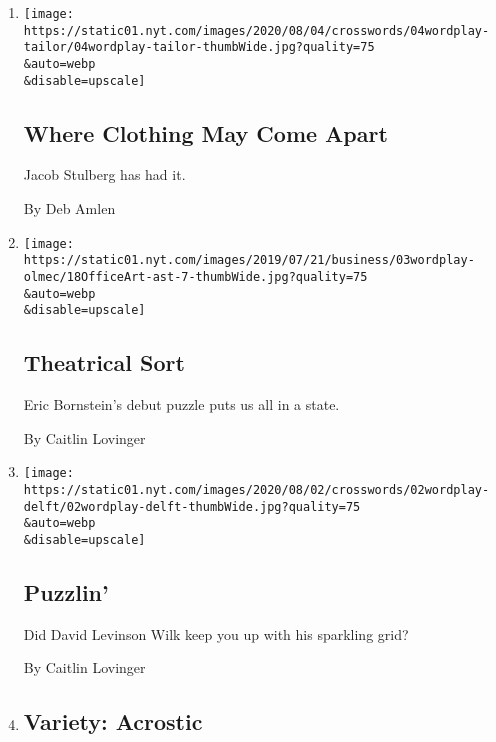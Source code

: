 \begin{enumerate}
\def\labelenumi{\arabic{enumi}.}
\item
  \href{/2020/08/03/crosswords/daily-puzzle-2020-08-04.html}{}

  \texttt{[image: https://static01.nyt.com/images/2020/08/04/crosswords/04wordplay-tailor/04wordplay-tailor-thumbWide.jpg?quality=75\\\&auto=webp\\\&disable=upscale]}

  \hypertarget{where-clothing-may-come-apart}{%
  \subsection{Where Clothing May Come
  Apart}\label{where-clothing-may-come-apart}}

  Jacob Stulberg has had it.

  By Deb Amlen
\item
  \href{/2020/08/02/crosswords/daily-puzzle-2020-08-03.html}{}

  \texttt{[image: https://static01.nyt.com/images/2019/07/21/business/03wordplay-olmec/18OfficeArt-ast-7-thumbWide.jpg?quality=75\\\&auto=webp\\\&disable=upscale]}

  \hypertarget{theatrical-sort}{%
  \subsection{Theatrical Sort}\label{theatrical-sort}}

  Eric Bornstein's debut puzzle puts us all in a state.

  By Caitlin Lovinger
\item
  \href{/2020/08/01/crosswords/daily-puzzle-2020-08-02.html}{}

  \texttt{[image: https://static01.nyt.com/images/2020/08/02/crosswords/02wordplay-delft/02wordplay-delft-thumbWide.jpg?quality=75\\\&auto=webp\\\&disable=upscale]}

  \hypertarget{puzzlin}{%
  \subsection{Puzzlin'}\label{puzzlin}}

  Did David Levinson Wilk keep you up with his sparkling grid?

  By Caitlin Lovinger
\item
  \href{/2020/08/01/crosswords/variety-acrostic.html}{}

  \hypertarget{variety-acrostic}{%
  \subsection{Variety: Acrostic}\label{variety-acrostic}}


\end{enumerate}
